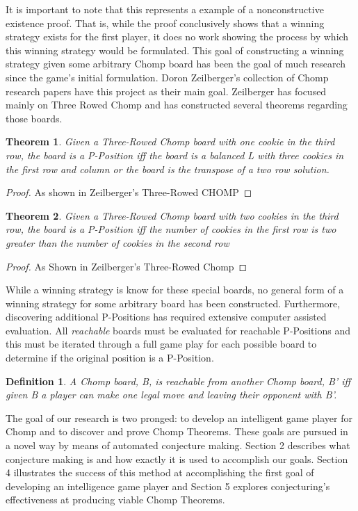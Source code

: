 \documentclass{amsart}
\newtheorem{thm}{Theorem}
\newtheorem{term}{Definition} %
\theoremstyle{definition}
\theoremstyle{remark}
\numberwithin{equation}{section}
\begin{document}
It is important to note that this represents a example of a nonconstructive existence proof. That is, while the proof conclusively shows that a winning strategy exists for the first player, it does no work showing the process by which this winning strategy would be formulated. This goal of constructing a winning strategy given some arbitrary Chomp board has been the goal of much research since the game's initial formulation. Doron Zeilberger's collection of Chomp research papers have this project as their main goal. Zeilberger has focused mainly on Three Rowed Chomp and has constructed several theorems regarding those boards.

\begin{thm}
Given a Three-Rowed Chomp board with one cookie in the third row, the board is a P-Position iff the board is a balanced L with three cookies in the first row and column or the board is the transpose of a two row solution.
\end{thm}
\begin{proof}
As shown in Zeilberger's Three-Rowed CHOMP\cite{zeilberger}
\end{proof}

\begin{thm}
Given a Three-Rowed Chomp board with two cookies in the third row, the board is a P-Position iff the number of cookies in the first row is two greater than the number of cookies in the second row
\end{thm}
\begin{proof}
As Shown in Zeilberger's Three-Rowed Chomp\cite{zeilberger}
\end{proof}



While a winning strategy is know for these special boards, no general form of a winning strategy for some arbitrary board has been constructed. Furthermore, discovering additional P-Positions has required extensive computer assisted evaluation. All \textit{reachable} boards must be evaluated for reachable P-Positions and this must be iterated through a full game play for each possible board to determine if the original position is a P-Position.


\begin{term} A Chomp board, B, is reachable from another Chomp board, B' iff given B a player can make one legal move and leaving their opponent with B'.
\end{term}

The goal of our research is two pronged: to develop an intelligent game player for Chomp and to discover and prove Chomp Theorems. These goals are pursued in a novel way by means of automated conjecture making. Section 2 describes what conjecture making is and how exactly it is used to accomplish our goals. Section 4 illustrates the success of this method at accomplishing the first goal of developing an intelligence game player and Section 5 explores conjecturing's effectiveness at producing viable Chomp Theorems. \\
  
\end{document}
